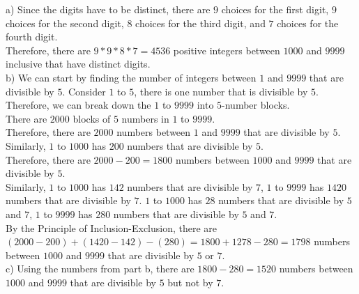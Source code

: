 \documentclass[12pt]{exam}
\begin{document}
\begin{solution}
	a) Since the digits have to be distinct, there are $9$ choices for the first digit, $9$ choices for the second digit, $8$ choices for the third digit, and $7$ choices for the fourth digit.\\
	Therefore, there are $9*9*8*7=4536$ positive integers between $1000$ and $9999$ inclusive that have distinct digits.\\
	b) We can start by finding the number of integers between $1$ and $9999$ that are divisible by $5$.
	Consider $1$ to $5$, there is one number that is divisible by $5$.\\
	Therefore, we can break down the $1$ to $9999$ into $5$-number blocks.\\
	There are $2000$ blocks of $5$ numbers in $1$ to $9999$.\\
	Therefore, there are $2000$ numbers between $1$ and $9999$ that are divisible by $5$.\\
	Similarly, $1$ to $1000$ has $200$ numbers that are divisible by $5$.\\
	Therefore, there are $2000-200=1800$ numbers between $1000$ and $9999$ that are divisible by $5$.\\
	Similarly, $1$ to $1000$ has $142$ numbers that are divisible by $7$, $1$ to $9999$ has $1420$ numbers that are divisible by $7$.
	$1$ to $1000$ has $28$ numbers that are divisible by $5$ and $7$, $1$ to $9999$ has $280$ numbers that are divisible by $5$ and $7$.\\
	By the Principle of Inclusion-Exclusion, there are $(2000-200)+(1420-142)-(280)=1800+1278-280=1798$ numbers between $1000$ and $9999$ that are divisible by $5$ or $7$.\\
	c) Using the numbers from part b, there are $1800-280=1520$ numbers between $1000$ and $9999$ that are divisible by $5$ but not by $7$.
\end{solution}
\end{document}
